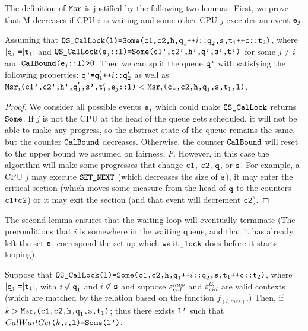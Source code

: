 The definition of ${\mathrm{\texttt{Msr}}}$ is justified by the following two
lemmas. First, we prove that M decreases if CPU $i$ is waiting and some other CPU
$j$ executes an event ${\mathrm{\texttt{e}}}_{j}$.

\begin{lemma}
\label{lem:chapter:mcslock:MCS_CalLock_progress_onestep}
Assuming that ${\mathrm{\texttt{QS\_CalLock}}}{\mathrm{\texttt{(l)=}}}{\mathrm{\texttt{Some}}}{\mathrm{\texttt{(c1,c2,h,q}}}_1{\mathrm{\texttt{++}}}i{\mathrm{\texttt{::q}}}_2{\mathrm{\texttt{,s,t}}}_1{\mathrm{\texttt{++c::t}}}_2{\mathrm{\texttt{)}}}$, where
$|{\mathrm{\texttt{q}}}_1|{\mathrm{\texttt{=}}}|{\mathrm{\texttt{t}}}_1|$ and ${\mathrm{\texttt{QS\_CalLock}}}{\mathrm{\texttt{(e}}}_j{\mathrm{\texttt{::l)=}}}{\mathrm{\texttt{Some}}}{\mathrm{\texttt{(c1',c2',h',q',s',t')}}} $
for some $j\neq i$ and 
 ${\mathrm{\texttt{CalBound}}}{\mathrm{\texttt{(e}}}_j{\mathrm{\texttt{::l)}}}{\mathrm{\texttt{>}}}0$.
Then we can split the queue ${\mathrm{\texttt{q'}}}$ with satisfying the following properties:
${\mathrm{\texttt{q'=q}}}_{1}'{\mathrm{\texttt{++}}}i{\mathrm{\texttt{::q}}}_{2}'$ as well as
${\mathrm{\texttt{Msr}}}_i{\mathrm{\texttt{(c1',c2',h',q}}}_{1}'{\mathrm{\texttt{,s',t}}}_{1}'{\mathrm{\texttt{,e}}}_j{\mathrm{\texttt{::l)}}}<{\mathrm{\texttt{Msr}}}_i{\mathrm{\texttt{(c1,c2,h,q}}}_1{\mathrm{\texttt{,s,t}}}_1{\mathrm{\texttt{,l)}}}$.
\end{lemma}

\begin{proof}
 We consider all possible events
${\mathrm{\texttt{e}}}_j$ which could make ${\mathrm{\texttt{QS\_CalLock}}}$ returns ${\mathrm{\texttt{Some}}}$. If $j$ is not the 
CPU at the head of the queue gets scheduled, it will not be
able to make any progress, so the abstract state of the queue remains the same,
but the counter ${\mathrm{\texttt{CalBound}}}$ decreases.
Otherwise, the counter ${\mathrm{\texttt{CalBound}}}$ will reset to the upper bound we assumed on fairness, $F$. 
However, in this case the algorithm will make some progresses that change ${\mathrm{\texttt{c1}}}$, ${\mathrm{\texttt{c2}}}$, ${\mathrm{\texttt{q}}}$, or ${\mathrm{\texttt{s}}}$.
For example, a CPU $j$ may execute  ${\mathrm{\texttt{SET\_NEXT}}}$ (which decreases the size of
${\mathrm{\texttt{s}}}$), it may enter the critical section (which moves some measure from
the head of ${\mathrm{\texttt{q}}}$ to the counters ${\mathrm{\texttt{c1+c2}}}$) or it may exit the section
(and that event will decrement ${\mathrm{\texttt{c2}}}$).
\end{proof}


The second lemma ensures that the waiting loop will eventually
terminate (The preconditions that $i$ is somewhere in the waiting queue,
and that it has already left the set ${\mathrm{\texttt{s}}}$, correspond the set-up
which ${\mathrm{\texttt{wait\_lock}}}$ does before it starts looping).

\begin{lemma}
\label{lem:chapter:mcslock:CalWaitGet_exist'}
Suppose that ${\mathrm{\texttt{QS\_CalLock}}}{\mathrm{\texttt{(l)=}}}{\mathrm{\texttt{Some}}}{\mathrm{\texttt{(c1,c2,h,q}}}_1{\mathrm{\texttt{++}}}i{\mathrm{\texttt{::q}}}_2{\mathrm{\texttt{,s,t}}}_1{\mathrm{\texttt{++c::t}}}_2{\mathrm{\texttt{)}}}$, where
$|{\mathrm{\texttt{q}}}_1|{\mathrm{\texttt{=}}}|{\mathrm{\texttt{t}}}_1|$, with $i \not\in{\mathrm{\texttt{q}}}_1$ and $i \not\in{\mathrm{\texttt{s}}}$ and suppose ${\varepsilon}^{mcs}_{cid}$ and ${\varepsilon}^{lk}_{cid}$  are valid
contexts (which are matched by the relation based on the function $f_{(l, mcs)}$.) Then, if $k>{\mathrm{\texttt{Msr}}}_i{\mathrm{\texttt{(c1,c2,h,q}}}_1{\mathrm{\texttt{,s,t}}}_1{\mathrm{\texttt{)}}}$; thus there exists ${\mathrm{\texttt{l'}}}$ such
that $CalWaitGet{\mathrm{\texttt{(}}}k{\mathrm{\texttt{,}}}i{\mathrm{\texttt{,l)=}}}{\mathrm{\texttt{Some}}}{\mathrm{\texttt{(l')}}}$.
\end{lemma}


